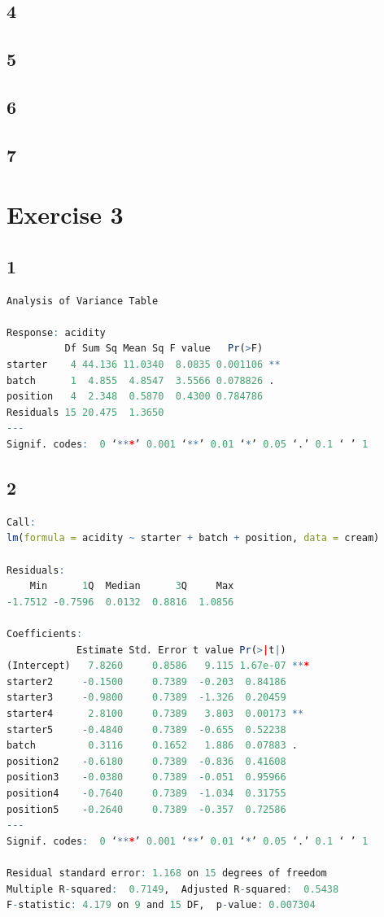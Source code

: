 \documentclass{article}
\begin{document}
    \subsection*{4}
    
    \subsection*{5}
    
    \subsection*{6}
    
    \subsection*{7}
    
  \section*{Exercise 3}
    \subsection*{1}
      \begin{lstlisting}[language=R]
Analysis of Variance Table

Response: acidity
          Df Sum Sq Mean Sq F value   Pr(>F)   
starter    4 44.136 11.0340  8.0835 0.001106 **
batch      1  4.855  4.8547  3.5566 0.078826 . 
position   4  2.348  0.5870  0.4300 0.784786   
Residuals 15 20.475  1.3650                    
---
Signif. codes:  0 ‘***’ 0.001 ‘**’ 0.01 ‘*’ 0.05 ‘.’ 0.1 ‘ ’ 1
      \end{lstlisting}
    
    \subsection*{2}
      \begin{lstlisting}[language=R]
Call:
lm(formula = acidity ~ starter + batch + position, data = cream)

Residuals:
    Min      1Q  Median      3Q     Max 
-1.7512 -0.7596  0.0132  0.8816  1.0856 

Coefficients:
            Estimate Std. Error t value Pr(>|t|)    
(Intercept)   7.8260     0.8586   9.115 1.67e-07 ***
starter2     -0.1500     0.7389  -0.203  0.84186    
starter3     -0.9800     0.7389  -1.326  0.20459    
starter4      2.8100     0.7389   3.803  0.00173 ** 
starter5     -0.4840     0.7389  -0.655  0.52238    
batch         0.3116     0.1652   1.886  0.07883 .  
position2    -0.6180     0.7389  -0.836  0.41608    
position3    -0.0380     0.7389  -0.051  0.95966    
position4    -0.7640     0.7389  -1.034  0.31755    
position5    -0.2640     0.7389  -0.357  0.72586    
---
Signif. codes:  0 ‘***’ 0.001 ‘**’ 0.01 ‘*’ 0.05 ‘.’ 0.1 ‘ ’ 1

Residual standard error: 1.168 on 15 degrees of freedom
Multiple R-squared:  0.7149,  Adjusted R-squared:  0.5438 
F-statistic: 4.179 on 9 and 15 DF,  p-value: 0.007304
      \end{lstlisting}
    
\end{document}
